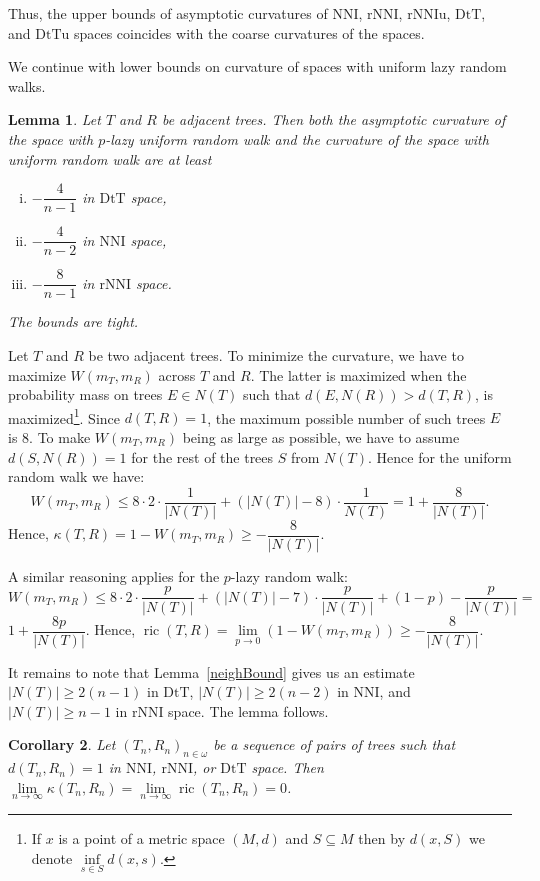 \documentclass{amsart}
\newtheorem{lemma}{Lemma}
\newtheorem{corollary}[lemma]{Corollary}
\theoremstyle{definition}
\newcommand{\nni}{\mathrm{NNI}}
\newcommand{\rnni}{\mathrm{rNNI}}
\newcommand{\rnniu}{\mathrm{rNNIu}}
\newcommand{\mdts}{\mathrm{DtT}}
\newcommand{\mdtsu}{\mathrm{DtTu}}
\newcommand{\ric}{\operatorname{ric}}
\begin{document}
Thus, the upper bounds of asymptotic curvatures of $\nni$, $\rnni$, $\rnniu$, $\mdts$, and $\mdtsu$ spaces coincides with the coarse curvatures of the spaces.

We continue with lower bounds on curvature of spaces with uniform lazy random walks.

\begin{lemma}\label{uniformLower}
Let $T$ and $R$ be adjacent trees.
Then both the asymptotic curvature of the space with $p$-lazy uniform random walk and the curvature of the space with uniform random walk are at least
\begin{enumerate}[(i)]
\item $-\dfrac{4}{n-1}$ in $\mdts$ space,
\item $-\dfrac{4}{n-2}$ in $\nni$ space,
\item $-\dfrac{8}{n-1}$ in $\rnni$ space.
\end{enumerate}

The bounds are tight.
\end{lemma}

\proof
Let $T$ and $R$ be two adjacent trees.
To minimize the curvature, we have to maximize $W(m_T, m_R)$ across $T$ and $R$.
The latter is maximized when the probability mass on trees $E\in N(T)$ such that $d(E, N(R)) > d(T, R)$, is
maximized\footnote{If $x$ is a point of a metric space $(M,d)$ and $S \subseteq M$ then by $d(x,S)$ we denote $\inf\limits_{s \in S} d(x,s)$.}.
Since $d(T, R) = 1$, the maximum possible number of such trees $E$ is
$8$.
To make $W(m_T,m_R)$ being as large as possible, we have to assume $d(S, N(R)) = 1$ for the rest of the trees $S$ from $N(T)$.
Hence for the uniform random walk we have:
\[
W(m_T,m_R)\leq 8 \cdot 2 \cdot \frac{1}{|N(T)|} +
(|N(T)| - 8) \cdot \frac{1}{N(T)} = 1 + \dfrac{8}{|N(T)|}.
\]
Hence, $\kappa(T,R) = 1 - W(m_T,m_R) \geq - \dfrac{8}{|N(T)|}$.

A similar reasoning applies for the $p$-lazy random walk:
\[
W(m_T,m_R)\leq 8 \cdot 2 \cdot \frac{p}{|N(T)|} +
(|N(T)| - 7) \cdot \frac{p}{|N(T)|} + (1-p) - \frac{p}{|N(T)|} =
\]
$1 + \dfrac{8p}{|N(T)|}$.
Hence, $\ric(T,R) = \lim\limits_{p\to0}\left(1 - W(m_T,m_R)\right) \geq - \dfrac{8}{|N(T)|}$.

It remains to note that Lemma~\ref{neighBound} gives us an estimate $|N(T)| \geq 2(n-1)$ in $\mdts$, $|N(T)| \geq 2(n-2)$ in $\nni$, and $|N(T)| \geq n-1$ in $\rnni$ space.
The lemma follows.
\endproof

\begin{corollary}\label{flatInLimDTS}
Let $(T_n,R_n)_{n\in\omega}$ be a sequence of pairs of trees such that $d(T_n,R_n) = 1$ in $\nni$, $\rnni$, or $\mdts$ space.
Then $\lim\limits_{n \to \infty}\kappa(T_n,R_n) = \lim\limits_{n \to \infty}\ric(T_n,R_n) = 0$.
\end{corollary}
\end{document}
